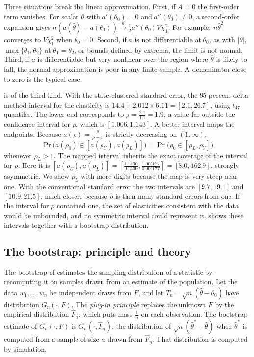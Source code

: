 Three situations break the linear approximation. First, if $A = 0$ the first-order term vanishes. For scalar
$\theta$ with $a'(\theta_0) = 0$ and $a''(\theta_0) \ne 0$, a second-order expansion gives
$n(a(\hat\theta) - a(\theta_0)) \xrightarrow{d} \frac{1}{2}a''(\theta_0)V\chi^2_1$. For example, $n\hat\theta^2$
converges to $V\chi^2_1$ when $\theta_0 = 0$. Second, if $a$ is not differentiable at $\theta_0$, as with $|\theta|$,
$\max\{\theta_1, \theta_2\}$ at $\theta_1 = \theta_2$, or bounds defined by extrema, the limit is not normal.
Third, if $a$ is differentiable but very nonlinear over the region where $\hat\theta$ is likely to fall, the normal
approximation is poor in any finite sample. A denominator close to zero is the typical case.

 is of the third kind. With the state-clustered standard error, the 95 percent
delta-method interval for the elasticity is $14.4 \pm 2.012 \times 6.11 = [2.1, 26.7]$, using $t_{47}$ quantiles. The
lower end corresponds to $\rho = \frac{2.1}{1.1} = 1.9$, a value far outside the confidence interval for $\rho$,
which is $[1.006, 1.143]$. A better interval maps the endpoints. Because $a(\rho) = \frac{\rho}{\rho - 1}$ is
strictly decreasing on $(1, \infty)$,
\begin{equation*}
  \Pr\bigl(a(\rho_0) \in [a(\rho_U), a(\rho_L)]\bigr) = \Pr\bigl(\rho_0 \in [\rho_L, \rho_U]\bigr)
\end{equation*}
whenever $\rho_L > 1$. The mapped interval inherits the exact coverage of the interval for $\rho$. Here it is
$[a(\rho_U), a(\rho_L)] = [\frac{1.1430}{0.1430}, \frac{1.006177}{0.006177}] = [8.0, 162.9]$, strongly asymmetric. We
show $\rho_L$ with more digits because the map is very steep near one. With the conventional standard error
the two intervals are $[9.7, 19.1]$ and $[10.9, 21.5]$, much closer, because $\hat\rho$ is then many standard errors
from one. If the interval for $\rho$ contained one, the set of elasticities consistent with the data would be
unbounded, and no symmetric interval could represent it.  shows these intervals together
with a bootstrap distribution.

\subsection{The bootstrap: principle and theory}\label{sec:A-boot}

The bootstrap of \citet{Efron1979} estimates the sampling distribution of a statistic by recomputing it on samples
drawn from an estimate of the population. Let the data $w_1, \dots, w_n$ be independent draws from $F$, and let
$T_n = \sqrt n(\hat\theta - \theta_0)$ have distribution $G_n(\cdot, F)$. The \emph{plug-in principle} replaces the
unknown $F$ by the empirical distribution $\hat F_n$, which puts mass $\frac{1}{n}$ on each observation. The
bootstrap estimate of $G_n(\cdot, F)$ is $G_n(\cdot, \hat F_n)$, the distribution of $\sqrt n(\hat\theta^* -
\hat\theta)$ when $\hat\theta^*$ is computed from a sample of size $n$ drawn from $\hat F_n$. That distribution is
computed by simulation.

